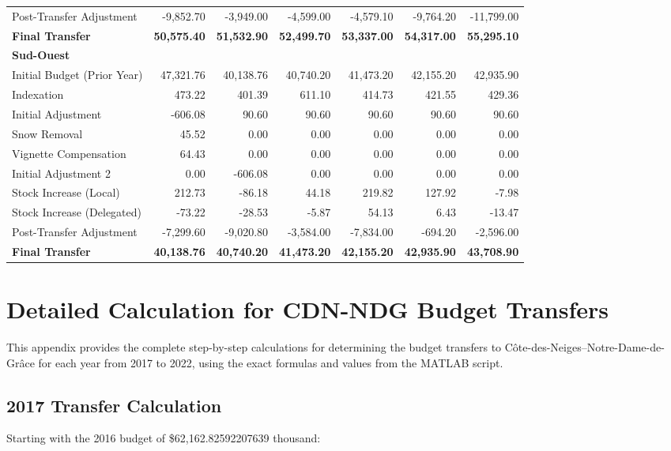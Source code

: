 \documentclass{article}
\begin{document}
\begin{longtable}{lrrrrrr}
Post-Transfer Adjustment & -9,852.70 & -3,949.00 & -4,599.00 & -4,579.10 & -9,764.20 & -11,799.00 \\
\textbf{Final Transfer} & \textbf{50,575.40} & \textbf{51,532.90} & \textbf{52,499.70} & \textbf{53,337.00} & \textbf{54,317.00} & \textbf{55,295.10} \\
\midrule
\multicolumn{7}{l}{\textbf{Sud-Ouest}} \\
\midrule
Initial Budget (Prior Year) & 47,321.76 & 40,138.76 & 40,740.20 & 41,473.20 & 42,155.20 & 42,935.90 \\
Indexation & 473.22 & 401.39 & 611.10 & 414.73 & 421.55 & 429.36 \\
Initial Adjustment & -606.08 & 90.60 & 90.60 & 90.60 & 90.60 & 90.60 \\
Snow Removal & 45.52 & 0.00 & 0.00 & 0.00 & 0.00 & 0.00 \\
Vignette Compensation & 64.43 & 0.00 & 0.00 & 0.00 & 0.00 & 0.00 \\
Initial Adjustment 2 & 0.00 & -606.08 & 0.00 & 0.00 & 0.00 & 0.00 \\
Stock Increase (Local) & 212.73 & -86.18 & 44.18 & 219.82 & 127.92 & -7.98 \\
Stock Increase (Delegated) & -73.22 & -28.53 & -5.87 & 54.13 & 6.43 & -13.47 \\
Post-Transfer Adjustment & -7,299.60 & -9,020.80 & -3,584.00 & -7,834.00 & -694.20 & -2,596.00 \\
\textbf{Final Transfer} & \textbf{40,138.76} & \textbf{40,740.20} & \textbf{41,473.20} & \textbf{42,155.20} & \textbf{42,935.90} & \textbf{43,708.90} \\
\bottomrule
\end{longtable}

\appendix
\section{Detailed Calculation for CDN-NDG Budget Transfers}

This appendix provides the complete step-by-step calculations for determining the budget transfers to Côte-des-Neiges–Notre-Dame-de-Grâce for each year from 2017 to 2022, using the exact formulas and values from the MATLAB script.

\subsection{2017 Transfer Calculation}

Starting with the 2016 budget of \$62,162.82592207639 thousand:
\end{document}
